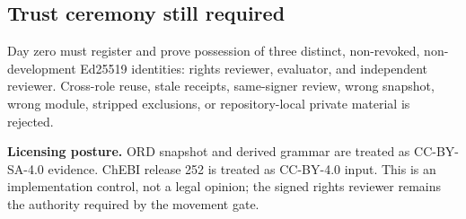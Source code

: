 \documentclass[10pt,a4paper]{article}
\begin{document}
\subsection*{Trust ceremony still required}
Day zero must register and prove possession of three distinct, non-revoked, non-development Ed25519 identities: rights reviewer, evaluator, and independent reviewer. Cross-role reuse, stale receipts, same-signer review, wrong snapshot, wrong module, stripped exclusions, or repository-local private material is rejected.

\begin{tcolorbox}[colback=PaleOrange,colframe=Orange!45,boxrule=.5pt,arc=2mm]
\textbf{Licensing posture.} ORD snapshot and derived grammar are treated as CC-BY-SA-4.0 evidence. ChEBI release 252 is treated as CC-BY-4.0 input. This is an implementation control, not a legal opinion; the signed rights reviewer remains the authority required by the movement gate.
\end{tcolorbox}
\newpage
\end{document}
